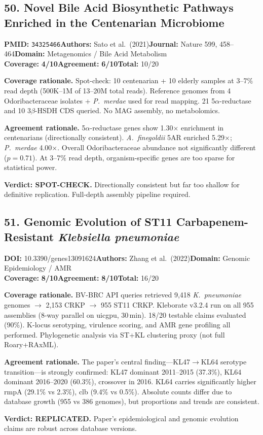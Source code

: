 \documentclass[11pt]{article}
\newcommand{\scorebadge}[2]{\textbf{#1:} \textbf{#2/10}}
\begin{document}
\subsection{50. Novel Bile Acid Biosynthetic Pathways Enriched in the Centenarian Microbiome}
\textbf{PMID:} \texttt{34325466}\quad\textbf{Authors:} Sato et al.\ (2021)\quad\textbf{Journal:} Nature 599, 458--464\quad\textbf{Domain:} Metagenomics / Bile Acid Metabolism\\
\scorebadge{Coverage}{4}\quad\scorebadge{Agreement}{6}\quad\textbf{Total:} 10/20\par\smallskip
\noindent\textbf{Coverage rationale.} Spot-check: 10 centenarian + 10 elderly samples at 3--7\% read depth (500K--1M of 13--20M total reads). Reference genomes from 4 Odoribacteraceae isolates + \textit{P.\ merdae} used for read mapping. 21 5$\alpha$-reductase and 10 3$\beta$-HSDH CDS queried. No MAG assembly, no metabolomics.\par
\noindent\textbf{Agreement rationale.} 5$\alpha$-reductase genes show 1.30$\times$ enrichment in centenarians (directionally consistent). \textit{A.\ finegoldii} 5AR enriched 5.29$\times$; \textit{P.\ merdae} 4.00$\times$. Overall Odoribacteraceae abundance not significantly different ($p=0.71$). At 3--7\% read depth, organism-specific genes are too sparse for statistical power.\par\smallskip
\noindent\textbf{Verdict: SPOT-CHECK.} Directionally consistent but far too shallow for definitive replication. Full-depth assembly pipeline required.

\subsection{51. Genomic Evolution of ST11 Carbapenem-Resistant \textit{Klebsiella pneumoniae}}
\textbf{DOI:} 10.3390/genes13091624\quad\textbf{Authors:} Zhang et al.\ (2022)\quad\textbf{Domain:} Genomic Epidemiology / AMR\\
\scorebadge{Coverage}{8}\quad\scorebadge{Agreement}{8}\quad\textbf{Total:} 16/20\par\smallskip
\noindent\textbf{Coverage rationale.} BV-BRC API queries retrieved 9,418 \textit{K.\ pneumoniae} genomes $\to$ 2,153 CRKP $\to$ 955 ST11 CRKP. Kleborate v3.2.4 run on all 955 assemblies (8-way parallel on uicgpu, 30\,min). 18/20 testable claims evaluated (90\%). K-locus serotyping, virulence scoring, and AMR gene profiling all performed. Phylogenetic analysis via ST+KL clustering proxy (not full Roary+RAxML).\par
\noindent\textbf{Agreement rationale.} The paper's central finding---KL47$\to$KL64 serotype transition---is strongly confirmed: KL47 dominant 2011--2015 (37.3\%), KL64 dominant 2016--2020 (60.3\%), crossover in 2016. KL64 carries significantly higher rmpA (29.1\% vs 2.3\%), clb (9.4\% vs 0.5\%). Absolute counts differ due to database growth (955 vs 386 genomes), but proportions and trends are consistent.\par\smallskip
\noindent\textbf{Verdict: REPLICATED.} Paper's epidemiological and genomic evolution claims are robust across database versions.
\end{document}
